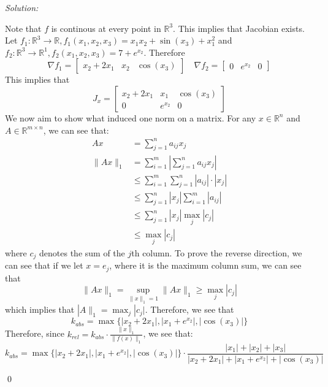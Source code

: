 \documentclass[12pt]{article}
\newenvironment{problem}[2][Problem]{\begin{trivlist}
\item[\hskip \labelsep {\bfseries #1}\hskip \labelsep {\bfseries #2.}]}{\end{trivlist}}
\newenvironment{sol}
    {\emph{Solution:}
    }
    {
    \qed
    }
\newcommand{\R}{\mathbb{R}}
\begin{document}

\begin{problem}{1}
    
\end{problem}
\begin{sol}
    Note that $f$ is continous at every point in $\R^3$. This implies that Jacobian exists. Let $f_1: \R^3 \to \R, f_1(x_1, x_2, x_3) =  x_1 x_2 + \sin(x_3) + x_1^2$ and $f_2: \R^3 \to \R^1, f_2(x_1, x_2, x_3) = 7 + e^{x_2}$. Therefore 
    \[
    \nabla f_1  = \begin{bmatrix}
        x_2 + 2x_1 & x_2 & \cos(x_3)
    \end{bmatrix} \quad 
    \nabla f_2 = \begin{bmatrix}
        0 & e^{x_2} & 0
    \end{bmatrix}
    \]  
    This implies that 
    \[
    J_x = \begin{bmatrix}
        x_2 + 2x_1 & x_1 & \cos(x_3) \\
        0 & e^{x_2} & 0 
    \end{bmatrix}
    \]
    We now aim to show what induced one norm on a matrix. For any $x \in \R^n$ and $A \in \R^{m \times n}$, we can see that:
    \begin{align*}
        Ax &= \sum_{j = 1}^n a_{ij} x_j\\
        \|Ax\|_1 &= \sum_{i = 1}^{m} \left | \sum_{j = 1}^{n} a_{ij} x_j \right |\\
        &\leq \sum_{i = 1}^{m} \sum_{j = 1}^{n} |a_{ij}| \cdot |x_j|\\
        &\leq \sum_{j = 1}^{n} |x_j| \sum_{i = 1}^{m} |a_{ij}|\\
        &\leq \sum_{j = 1}^{n} |x_j| \max_j |c_j|\\
        &\leq \max_j |c_j|
    \end{align*}
    where $c_j$ denotes the sum of the $j$th column. To prove the reverse direction, we can see that if we let $x = e_j$, where it is the maximum column sum, we can see that 
    \[
    \|Ax\|_1 = \sup_{\|x\|_ 1 = 1} \|Ax\|_1 \geq \max_j |c_j |
    \]  
    which implies that $|A\|_1 = \max_j |c_j|$. Therefore, we see that 
    \[
        k_{abs} = \max \{ |x_2 + 2x_1| , |x_1 + e^{x_2}|, |\cos(x_3)|\}
    \]
    Therefore, since $k_{rel} = k_{abs} \cdot \frac{\|x\|_1}{\|f(x)\|_1}$, we see that:
    \[
    k_{abs} = \max \{ |x_2 + 2x_1| , |x_1 + e^{x_2}|, |\cos(x_3)|\} \cdot \frac{|x_1| + |x_2| + |x_3|}{|x_2 + 2x_1| + |x_1 + e^{x_2}| + |\cos(x_3)|}
    \]
\end{sol}
\end{document}
